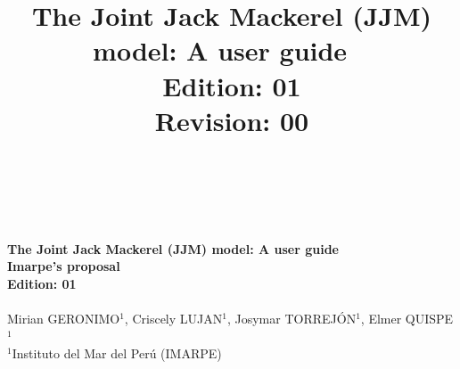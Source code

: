 \documentclass{article}
\title{The Joint Jack Mackerel (JJM) model: A user guide
\ \\[3mm] 
        {Edition: 01}\\
        {Revision: 00}\\
		\ \\[0.5mm]}
\date{\parbox{\linewidth}{\centering%
  \skip
  Mirian GERONIMO \hspace*{0.8cm} Criscely LUJAN \hspace*{0.8cm} Josymar TORREJON \hspace*{0.8cm} Elmer QUISPE \endgraf\medskip
  Instituto del Mar del Perú (IMARPE)}
  }
\begin{document}

		
		
	
		

\begin{center}
    \ \\[5mm]
        {\textbf{\Large The Joint Jack Mackerel (JJM) model: A user guide \\
        Imarpe's proposal}		
		\ \\[3mm] 
        {\bf Edition: 01}\\
        
		\ \\[0.5mm]}
  {Mirian GERONIMO$^{1}$,  Criscely LUJAN$^{1}$, Josymar TORREJÓN$^{1}$, Elmer QUISPE$^{1}$}\\
  \small{$^{1}$Instituto del Mar del Perú (IMARPE)}

\end{center}
\end{document}
